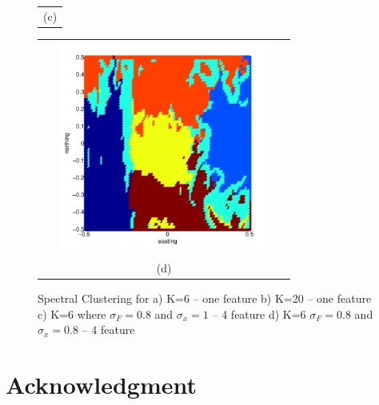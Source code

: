 \documentclass[12pt,letterpaper]{article}
\begin{document}
\begin{figure}[ht!]
\begin{minipage}[b]{0.5\textwidth}
\begin{tabular}{c}
      (c)
    \end{tabular}
  \end{minipage}
  \begin{minipage}{0.5\textwidth}
    \begin{tabular}{c}
      \includegraphics[width=8cm,height=7cm,keepaspectratio]{figs/Spectral1.pdf}\\
      (d)
    \end{tabular}
  \end{minipage}
   \caption{Spectral Clustering for a) K=6 -- one feature b) K=20 -- one feature c) K=6  where $\sigma_F = 0.8$ and $\sigma_x = 1$ -- 4 feature d) K=6  $\sigma_F = 0.8$ and $\sigma_x = 0.8$ -- 4 feature}\label{fig:fig4}
\end{figure}

\section*{Acknowledgment}
 
\end{document}
